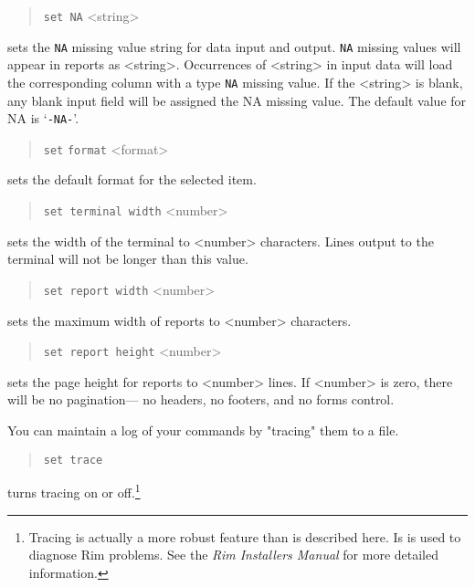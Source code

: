\documentclass[11pt,a4paper]{report}
\begin{document}
 
%
\begin{verse}
  \verb!set NA! <string>
\end{verse}
sets the \verb!NA! missing value string for data input and output.
\verb!NA! missing values will appear in reports as <string>.
Occurrences of <string> in input data will load the corresponding
column with a type \verb!NA! missing value.
If the <string> is blank, any blank input field will
be assigned the NA missing value.
The default value for NA is `{\tt-NA-}'.
%
\begin{verse}
  \verb!set!  \verb!format! <format>
\end{verse}
sets the default format for the selected item.
%
\begin{verse}
  \verb!set terminal width! <number>
\end{verse}
sets the width of the terminal to <number> characters.
Lines output to the terminal will not be longer than this value.
%
\begin{verse}
  \verb!set report width! <number>
\end{verse}
sets the maximum width of reports to <number> characters.
\label{set-height}
\begin{verse}
  \verb!set report height! <number>
\end{verse}
sets the page height for reports to <number> lines.
If <number> is zero, there will be no pagination---%
no headers, no footers, and no forms control.
 
\label{set-trace}
You can maintain a log of your commands by "tracing" them to
a file.
\begin{verse}
  \verb!set trace! 
\end{verse}
turns tracing on or off.\footnote{Tracing is actually a more
robust feature than is described here.  Is is used to
diagnose Rim problems.  See the {\it Rim Installers Manual}
for more detailed information.}
\end{document}
